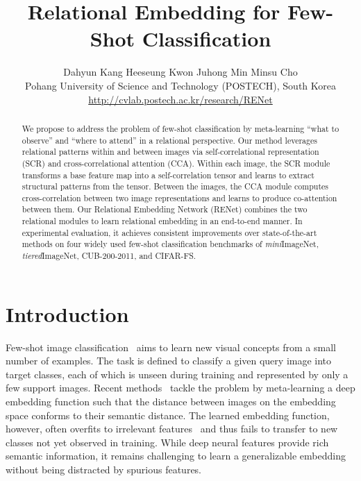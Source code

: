 \documentclass[10pt,twocolumn,letterpaper]{article}
\newcommand{\itmini}{\textit{mini}}
\newcommand{\ittiered}{\textit{tiered}}
\newcommand{\ours}{RENet\xspace}
\begin{document}
\title{Relational Embedding for Few-Shot Classification}
\author{Dahyun Kang \quad Heeseung Kwon \quad Juhong Min \quad Minsu Cho\vspace{0.15cm}\\ 
Pohang University of Science and Technology (POSTECH), South Korea\\
{\small \url{http://cvlab.postech.ac.kr/research/RENet}}
}

\maketitle
\ificcvfinal\thispagestyle{empty}\fi

\begin{abstract}
We propose to address the problem of few-shot classification by meta-learning ``what to observe'' and ``where to attend'' in a relational perspective.
Our method leverages relational patterns within and between images via self-correlational representation (SCR) and cross-correlational attention (CCA).
Within each image, the SCR module transforms a base feature map into a self-correlation tensor and learns to extract structural patterns from the tensor. 
Between the images, the CCA module computes cross-correlation between two image representations and learns to produce co-attention between them.
Our Relational Embedding Network (\ours) combines the two relational modules to learn relational embedding in an end-to-end manner.
In experimental evaluation, it achieves consistent improvements over state-of-the-art methods on four widely used few-shot classification benchmarks of \itmini ImageNet, \ittiered ImageNet, CUB-200-2011, and CIFAR-FS. 
\end{abstract} 

\section{Introduction}
Few-shot image classification~\cite{fei2006one, matchingnet, ravi2016optimization, koch2015siamese} aims to learn new visual concepts from a small number of examples.
The task is defined to classify a given query image into target classes, each of which is unseen during training and represented by only a few support images.
Recent methods~\cite{matchingnet, protonet, tadam, allen2019infinite, li2019revisiting, tewam, can, feat, deepemd, conceptlearners} tackle the problem by meta-learning a deep embedding function such that the distance between images on the embedding space conforms to their semantic distance. 
The learned embedding function, however, often overfits to irrelevant features~\cite{geirhos2018imagenet, brendel2019approximating, crosstransformers} and thus fails to transfer to new classes not yet observed in training.
While deep neural features provide rich semantic information, it remains challenging to learn a generalizable embedding without being distracted by spurious features.
\end{document}
